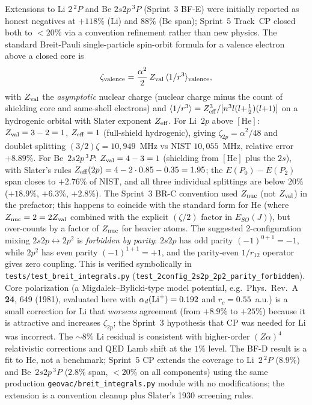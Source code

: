 \documentclass[aps,pra,twocolumn,superscriptaddress,longbibliography]{revtex4-2}
\begin{document}
Extensions to Li $2\,^2\!P$ and Be $2s2p\,^3\!P$ (Sprint~3 BF-E)
were initially reported as honest negatives at $+118\%$ (Li) and $88\%$
(Be span); Sprint~5 Track~CP closed both to $<20\%$ via a convention
refinement rather than new physics.  The standard
Breit-Pauli single-particle spin-orbit formula for a valence electron
above a closed core is
\begin{equation}\label{eq:zeta_std}
  \zeta_{\rm valence} = \frac{\alpha^{2}}{2}\,Z_{\rm val}\,
                          \langle 1/r^{3} \rangle_{\rm valence},
\end{equation}
with $Z_{\rm val}$ the \emph{asymptotic} nuclear charge (nuclear charge
minus the count of shielding core and same-shell electrons) and
$\langle 1/r^{3} \rangle = Z_{\rm eff}^{3}/[n^{3}l(l{+}\tfrac{1}{2})(l{+}1)]$
on a hydrogenic orbital with Slater exponent $Z_{\rm eff}$.
For Li~$2p$ above $[\mathrm{He}]$: $Z_{\rm val} = 3 - 2 = 1$,
$Z_{\rm eff} = 1$ (full-shield hydrogenic), giving
$\zeta_{2p} = \alpha^{2}/48$ and doublet splitting
$(3/2)\zeta = 10{,}949$~MHz vs NIST $10{,}055$~MHz, relative error
$+8.89\%$.  For Be~$2s2p\,^3\!P$: $Z_{\rm val} = 4 - 3 = 1$
(shielding from $[\mathrm{He}]$ plus the $2s$), with Slater's rules
$Z_{\rm eff}(2p) = 4 - 2\cdot 0.85 - 0.35 = 1.95$; the
$E(P_{0}){-}E(P_{2})$ span closes to $+2.76\%$ of NIST, and all
three individual splittings are below $20\%$ ($+18.9\%$, $+6.3\%$,
$+2.8\%$).  The Sprint~3 BR-C convention used
$Z_{\rm nuc}$ (not $Z_{\rm val}$) in the prefactor;
this happens to coincide with the standard form for He
(where $Z_{\rm nuc} = 2 = 2Z_{\rm val}$ combined with the explicit
$(\zeta/2)$ factor in $E_{SO}(J)$), but over-counts by a factor
of $Z_{\rm nuc}$ for heavier atoms.
The suggested 2-configuration mixing $2s2p \leftrightarrow 2p^{2}$
is \emph{forbidden by parity}: $2s2p$ has odd parity $(-1)^{0+1} = -1$,
while $2p^{2}$ has even parity $(-1)^{1+1} = +1$, and the
parity-even $1/r_{12}$ operator gives zero coupling.  This is verified
symbolically in \texttt{tests/test\_breit\_integrals.py}
(\texttt{test\_2config\_2s2p\_2p2\_parity\_forbidden}).
Core polarization (a Migdalek--Bylicki-type model potential,
e.g.\ Phys.~Rev.~A \textbf{24}, 649 (1981), evaluated here with
$\alpha_{d}({\rm Li}^{+}) = 0.192$
and $r_{c} = 0.55$~a.u.) is a small correction for Li that
\emph{worsens} agreement (from $+8.9\%$ to $+25\%$) because it is
attractive and increases $\zeta_{2p}$; the Sprint~3 hypothesis that CP
was needed for Li was incorrect.  The $\sim 8\%$ Li residual is
consistent with higher-order $(Z\alpha)^{4}$ relativistic corrections
and QED Lamb shift at the $1\%$ level.
The BF-D result is a fit to He, not a benchmark; Sprint~5 CP extends the coverage to
Li~$2\,^2\!P$ ($8.9\%$) and Be~$2s2p\,^3\!P$ ($2.8\%$ span, $<20\%$
on all components) using the same production
\texttt{geovac/breit\_integrals.py} module with no modifications;
the extension is a convention cleanup plus Slater's 1930 screening rules.
\end{document}
